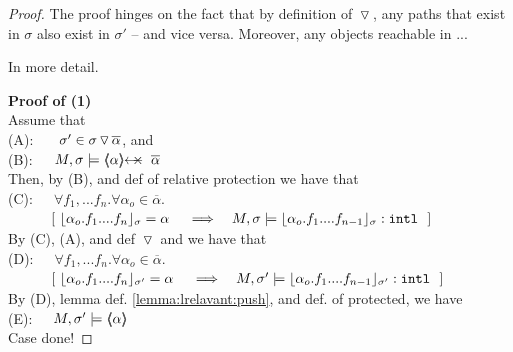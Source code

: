 \begin{proof}
The proof hinges on the fact that by definition of $\, {\triangledown}\,$, any paths that exist in $\sigma$  also exist in $\sigma'$ -- and vice versa.
Moreover, any objects reachable in ...

In more detail.

\vspace{.2cm}
\noindent
\textbf{Proof of (1)}\\
Assume that\\
(A): \ \ \ $\sigma' \in  \sigma \, {\triangledown}\,  \overline \alpha$, and \\
(B):\ \ \  $M,  \sigma \models \protectedFrom {\alpha} {\overline \alpha}$ 
 \\
Then, by  (B), and def of relative protection  we have that
\\
(C):\ \ \ $\forall  f_1, ... f_n. \forall \alpha_o \in \overline \alpha.$ \\
$\strut \ \ \ \ \ \ \ \ \  [\ {\interpret {\sigma} {\alpha_o.f_1....f_n}} =\alpha\ 
 \ \ \    \Longrightarrow  \ \ \   M, \sigma \models \internal {\interpret {\sigma} {\alpha_o.f_1....f_{n-1}}}\ \ ]$
\\
By (C), (A), and def $\, {\triangledown}\,$ and we have that 
\\
(D):\ \ \ $\forall  f_1, ... f_n. \forall \alpha_o \in \overline \alpha.$ \\
$\strut \ \ \ \ \ \ \ \ \  [\ {\interpret {\sigma'} {\alpha_o.f_1....f_n}} =\alpha\ 
 \ \ \    \Longrightarrow  \ \ \   M, \sigma' \models \internal {\interpret {\sigma'} {\alpha_o.f_1....f_{n-1}}}\ \ ]$
\\
By (D), lemma def. \ref{lemma:lrelavant:push}, and def. of protected, we have 
\\
(E):\ \ \ $M,  \sigma' \models \langle\!\!\langle \alpha \rangle\!\!\rangle$
\\
Case done!


\end{proof}
